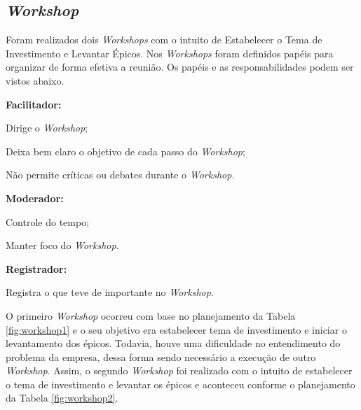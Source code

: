 \subsection{\textit{Workshop}}
  Foram realizados dois \textit{Workshops} com o intuito de Estabelecer o Tema de Investimento e Levantar Épicos. Nos \textit{Workshops}
  foram definidos papéis para organizar de forma efetiva a reunião. Os papéis e as responsabilidades podem ser vistos abaixo.
  
\textbf{Facilitador:}

	Dirige o \textit{Workshop};
	
	Deixa bem claro o objetivo de cada passo do \textit{Workshop};
	
	Não permite críticas ou debates durante o \textit{Workshop}.
		
\textbf{Moderador:}

	Controle do tempo;
	
	Manter foco do \textit{Workshop}.
	
\textbf{Registrador:}

	Registra o que teve de importante no \textit{Workshop}.
	
O primeiro \textit{Workshop} ocorreu com base no planejamento da Tabela \ref{fig:workshop1} e o seu objetivo
era estabelecer tema de investimento e iniciar o levantamento dos épicos. Todavia, houve uma dificuldade no entendimento
do problema da empresa, dessa forma sendo necessário a execução de outro \textit{Workshop}. 
Assim, o segundo \textit{Workshop} foi realizado com o intuito de estabelecer o tema de investimento e levantar os épicos e aconteceu conforme o planejamento da Tabela
\ref{fig:workshop2}.


